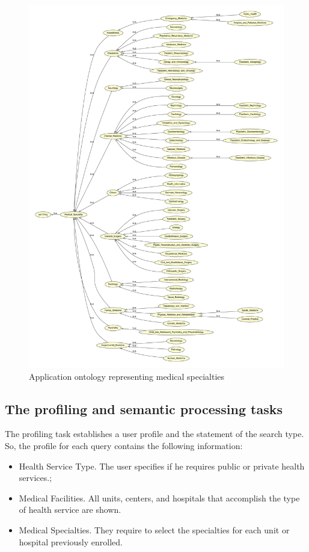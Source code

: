 \documentclass[sustainability,article,submit,pdftex,moreauthors]{Definitions/mdpi}
\begin{document}
\begin{figure}
	\begin{center}
		\includegraphics[width=1.0\textwidth]{onto.pdf}
	\end{center}
	\caption{Application ontology representing medical specialties\label{fig:ontologia}}
\end{figure}

\subsection{The profiling and semantic processing tasks}

The profiling task establishes a user profile and the statement of the search type. So, the profile for each query contains the following information:

\begin{itemize}
\item Health Service Type. The user specifies if he requires public or private health services.;
\item Medical Facilities. All units, centers, and hospitals that accomplish the type of health service are shown.
\item Medical Specialties. They require to select the specialties for each unit or hospital previously enrolled.
\end{itemize}
\end{document}
